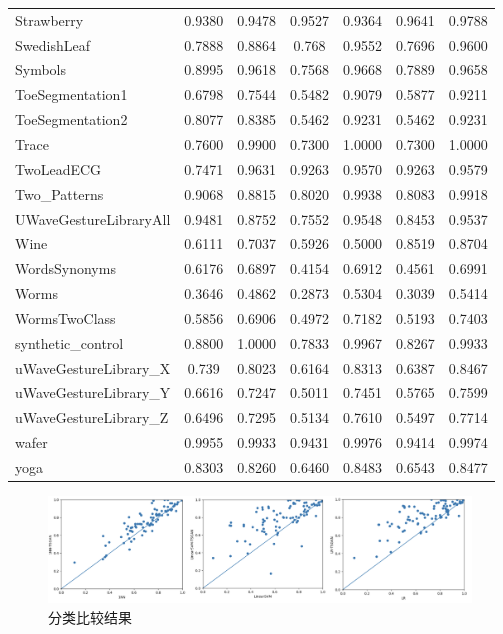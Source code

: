 \begin{longtable}[c]{p{5cm}*{6}{c}}
Strawberry &0.9380 &0.9478 &0.9527 &0.9364 &0.9641 &0.9788 \\
SwedishLeaf &0.7888 &0.8864 &0.768 &0.9552 &0.7696 &0.9600 \\
Symbols &0.8995 &0.9618 &0.7568 &0.9668 &0.7889 &0.9658 \\
ToeSegmentation1 &0.6798&0.7544 &0.5482 &0.9079 &0.5877 &0.9211 \\
ToeSegmentation2 &0.8077 &0.8385 &0.5462 &0.9231 &0.5462 &0.9231 \\
Trace &0.7600 &0.9900 &0.7300 &1.0000 &0.7300 &1.0000 \\
TwoLeadECG &0.7471 &0.9631 &0.9263 &0.9570 &0.9263 &0.9579 \\
Two\_Patterns &0.9068 &0.8815 &0.8020 &0.9938 &0.8083 &0.9918 \\
UWaveGestureLibraryAll &0.9481 &0.8752 &0.7552 &0.9548 &0.8453 &0.9537 \\
Wine &0.6111 &0.7037 &0.5926 &0.5000 &0.8519 &0.8704 \\
WordsSynonyms &0.6176 &0.6897 &0.4154 &0.6912 &0.4561 &0.6991 \\
Worms &0.3646 &0.4862 &0.2873 &0.5304 &0.3039 &0.5414 \\
WormsTwoClass &0.5856 &0.6906 &0.4972 &0.7182 &0.5193 &0.7403 \\
synthetic\_control &0.8800 &1.0000 &0.7833 &0.9967 &0.8267 &0.9933 \\
uWaveGestureLibrary\_X &0.739 &0.8023 &0.6164 &0.8313 &0.6387 &0.8467 \\
uWaveGestureLibrary\_Y &0.6616 &0.7247 &0.5011 &0.7451 &0.5765 &0.7599 \\
uWaveGestureLibrary\_Z &0.6496 &0.7295 &0.5134 &0.7610 &0.5497 &0.7714 \\
wafer &0.9955 &0.9933 &0.9431 &0.9976 &0.9414 &0.9974 \\
yoga &0.8303 &0.8260 &0.6460 &0.8483 &0.6543 &0.8477 \\
\bottomrule[1.5pt]
\end{longtable}

\begin{figure}[H]
\centering
\includegraphics[scale=0.8]{figures/gan/acc.png}
\caption{分类比较结果}
\label{fig:gan-acc-knn}
\end{figure}

